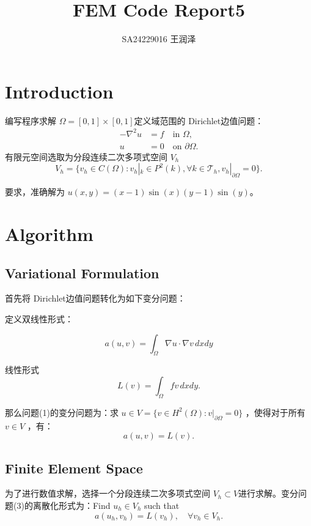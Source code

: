 \documentclass[11pt]{ctexart}
\title{FEM Code Report5}
\author{SA24229016 王润泽}
\begin{document}
\maketitle

\section{Introduction}
编写程序求解 $ \Omega=[0,1]\times [0,1] $定义域范围的 Dirichlet边值问题：
\begin{equation}
     \begin{aligned}
         -\nabla^2 u &= f \quad \text{in } \Omega, \\
         u &= 0 \quad \text{on } \partial \Omega.
     \end{aligned}
\end{equation}
有限元空间选取为分段连续二次多项式空间 $ V_h $
\begin{equation}
  V_h = \{ v_h \in C(\Omega) : v_h|_k \in P^2(k), \forall k \in \mathcal{T}_h, v_h|_{\partial \Omega} = 0 \}.
\end{equation}

要求，准确解为 $ u(x,y) = (x-1)\sin(x)(y-1)\sin(y) $。

\section{Algorithm}
\subsection{Variational Formulation}
首先将 Dirichlet边值问题转化为如下变分问题：

定义双线性形式：

$$ a(u,v) = \int_{\Omega} \nabla u \cdot \nabla v \, dx dy $$ 

线性形式 
$$ L(v) = \int_{\Omega} f v \, dx dy .$$

那么问题(1)的变分问题为：求 $ u \in V = \{ v \in H^2(\Omega) : v|_{\partial \Omega} = 0 \} $ ，使得对于所有 $ v \in V $ ，有：
\begin{equation}
     a(u,v) = L(v).
\end{equation}

\subsection{Finite Element Space}
为了进行数值求解，选择一个分段连续二次多项式空间 $ V_h \subset V$进行求解。变分问题(3)的离散化形式为：Find $ u_h \in V_h $ such that
\begin{equation}
  a(u_h,v_h) = L(v_h), \quad \forall v_h \in V_h.
\end{equation}
\end{document}
